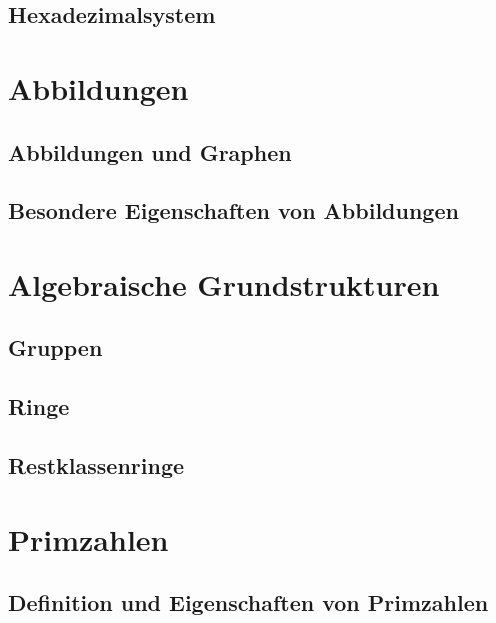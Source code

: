 \documentclass[a4paper,10pt]{article}
\begin{document}
\subsection{Hexadezimalsystem}



\section{Abbildungen}

\subsection{Abbildungen und Graphen}
\subsection{Besondere Eigenschaften von Abbildungen}



\section{Algebraische Grundstrukturen}

\subsection{Gruppen}
\subsection{Ringe}
\subsection{Restklassenringe}


\section{Primzahlen}

\subsection{Definition und Eigenschaften von Primzahlen}
\end{document}

